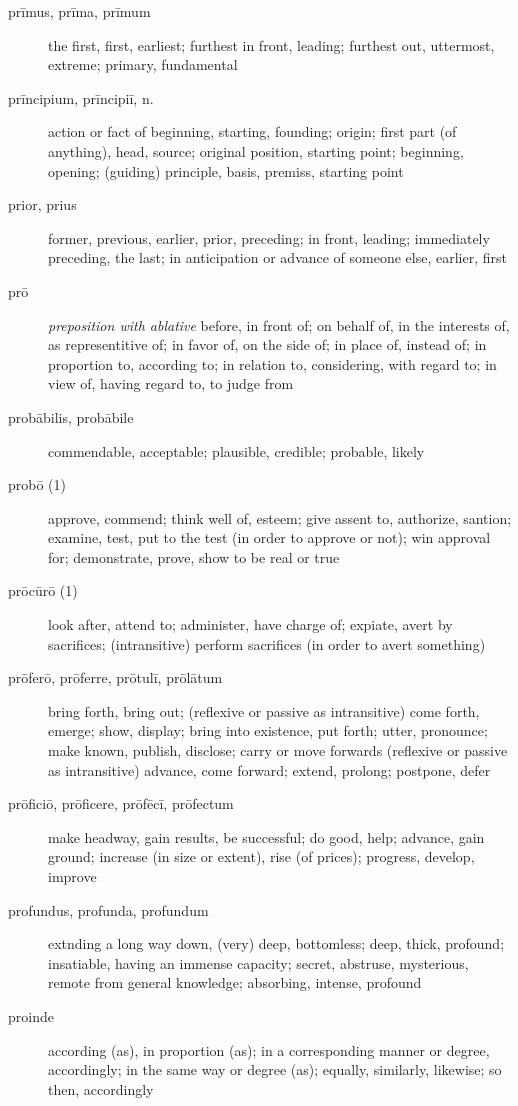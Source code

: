 \begin{description}
    \item[prīmus, prīma, prīmum] the first, first, earliest; furthest in front, leading; furthest out, uttermost, extreme; primary, fundamental
    \item[prīncipium, prīncipiī, n.] action or fact of beginning, starting, founding; origin; first part (of anything), head, source; original position, starting point; beginning, opening; (guiding) principle, basis, premiss, starting point
    \item[prior, prius] former, previous, earlier, prior, preceding; in front, leading; immediately preceding, the last; in anticipation or advance of someone else, earlier, first
    \item[prō] \textit{preposition with ablative} before, in front of; on behalf of, in the interests of, as representitive of; in favor of, on the side of; in place of, instead of; in proportion to, according to; in relation to, considering, with regard to; in view of, having regard to, to judge from
    \item[probābilis, probābile] commendable, acceptable; plausible, credible; probable, likely
    \item[probō (1)] approve, commend; think well of, esteem; give assent to, authorize, santion; examine, test, put to the test (in order to approve or not); win approval for; demonstrate, prove, show to be real or true
    \item[prōcūrō (1)] look after, attend to; administer, have charge of; expiate, avert by sacrifices; (intransitive) perform sacrifices (in order to avert something)
    \item[prōferō, prōferre, prōtulī, prōlātum] bring forth, bring out; (reflexive or passive as intransitive) come forth, emerge; show, display; bring into existence, put forth; utter, pronounce; make known, publish, disclose; carry or move forwards (reflexive or passive as intransitive) advance, come forward; extend, prolong; postpone, defer
    \item[prōficiō, prōficere, prōfēcī, prōfectum] make headway, gain results, be successful; do good, help; advance, gain ground; increase (in size or extent), rise (of prices); progress, develop, improve
    \item[profundus, profunda, profundum] extnding a long way down, (very) deep, bottomless; deep, thick, profound; insatiable, having an immense capacity; secret, abstruse, mysterious, remote from general knowledge; absorbing, intense, profound
    \item[proinde] according (as), in proportion (as); in a corresponding manner or degree, accordingly; in the same way or degree (as); equally, similarly, likewise; so then, accordingly

\end{description}
